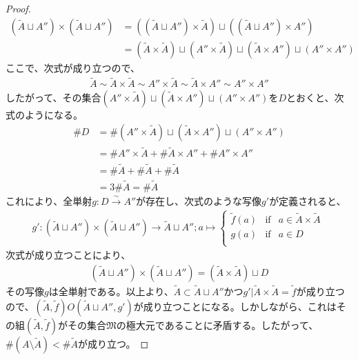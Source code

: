 \documentclass[dvipdfmx]{jsarticle}
\begin{document}
\begin{proof}
\begin{align*}
\left( \widetilde{A} \sqcup A'' \right) \times \left( \widetilde{A} \sqcup A'' \right) &= \left( \left( \widetilde{A} \sqcup A'' \right) \times \widetilde{A} \right) \sqcup \left( \left( \widetilde{A} \sqcup A'' \right) \times A'' \right)\\
&= \left( \widetilde{A} \times \widetilde{A} \right) \sqcup \left( A'' \times \widetilde{A} \right) \sqcup \left( \widetilde{A} \times A'' \right) \sqcup \left( A'' \times A'' \right)
\end{align*}
ここで、次式が成り立つので、
\begin{align*}
\widetilde{A} \sim \widetilde{A} \times \widetilde{A} \sim A'' \times \widetilde{A} \sim \widetilde{A} \times A'' \sim A'' \times A''
\end{align*}
したがって、その集合$\left( A'' \times \widetilde{A} \right) \sqcup \left( \widetilde{A} \times A'' \right) \sqcup \left( A'' \times A'' \right)$を$D$とおくと、次式のようになる。
\begin{align*}
\# D &= \# {\left( A'' \times \widetilde{A} \right) \sqcup \left( \widetilde{A} \times A'' \right) \sqcup \left( A'' \times A'' \right)}\\
&= \# {A'' \times \widetilde{A}} + \# {\widetilde{A} \times A''} + \# {A'' \times A''}\\
&= \# \widetilde{A} + \# \widetilde{A} + \# \widetilde{A}\\
&= 3\# \widetilde{A} = \# \widetilde{A}
\end{align*}
これにより、全単射$g:D\overset{\sim}{\rightarrow}A''$が存在し、次式のような写像$g'$が定義されると、
\begin{align*}
g':\left( \widetilde{A} \sqcup A'' \right) \times \left( \widetilde{A} \sqcup A'' \right) \rightarrow \widetilde{A} \sqcup A'';a \mapsto \left\{ \begin{matrix}
\widetilde{f}(a) & \mathrm{if} & a \in \widetilde{A} \times \widetilde{A} \\
g(a) & \mathrm{if} & a \in D \\
\end{matrix} \right.\ 
\end{align*}
次式が成り立つことにより、
\begin{align*}
\left( \widetilde{A} \sqcup A'' \right) \times \left( \widetilde{A} \sqcup A'' \right) = \left( \widetilde{A} \times \widetilde{A} \right) \sqcup D
\end{align*}
その写像$g$は全単射である。以上より、$\widetilde{A} \subset \widetilde{A} \sqcup A''$かつ$g'|\widetilde{A} \times \widetilde{A} = \widetilde{f}$が成り立つので、$\left( \widetilde{A},\widetilde{f} \right)O\left( \widetilde{A} \sqcup A'',g' \right)$が成り立つことになる。しかしながら、これはその組$\left( \widetilde{A},\widetilde{f} \right)$がその集合$\mathfrak{M}$の極大元であることに矛盾する。したがって、$\# \left( A \setminus \widetilde{A} \right) < \# \widetilde{A}$が成り立つ。\par

\end{proof}
\end{document}
